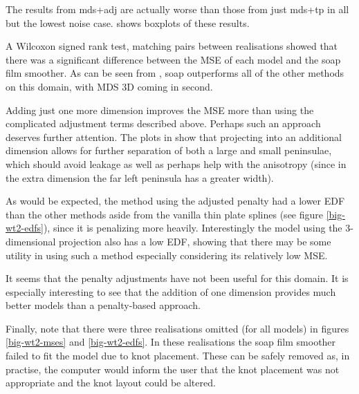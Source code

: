 The results from mds+adj are actually worse than those from just mds+tp in all but the lowest noise case.  shows boxplots of these results.

A Wilcoxon signed rank test, matching pairs between realisations showed that there was a significant difference between the MSE of each model and the soap film smoother. As can be seen from , soap outperforms all of the other methods on this domain, with MDS 3D coming in second. 

Adding just one more dimension improves the MSE more than using the complicated adjustment terms described above. Perhaps such an approach deserves further attention. The plots in  show that projecting into an additional dimension allows for further separation of both a large and small peninsulae, which should avoid leakage as well as perhaps help with the anisotropy (since in the extra dimension the far left peninsula has a greater width). 

As would be expected, the method using the adjusted penalty had a lower EDF than the other methods aside from the vanilla thin plate splines (see figure \ref{big-wt2-edfs}), since it is penalizing more heavily. Interestingly the model using the 3-dimensional projection also has a low EDF, showing that there may be some utility in using such a method especially considering its relatively low MSE.

It seems that the penalty adjustments have not been useful for this domain. It is especially interesting to see that the addition of one dimension provides much better models than a penalty-based approach.

Finally, note that there were three realisations omitted (for all models) in figures \ref{big-wt2-mses} and \ref{big-wt2-edfs}. In these realisations the soap film smoother failed to fit the model due to knot placement. These can be safely removed as, in practise, the computer would inform the user that the knot placement was not appropriate and the knot layout could be altered.

